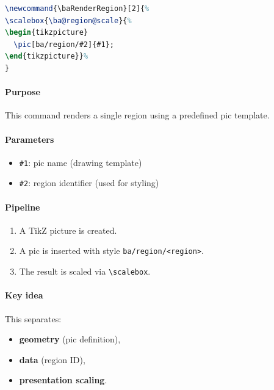 \begin{lstlisting}[language=LaTeX]
\newcommand{\baRenderRegion}[2]{%
\scalebox{\ba@region@scale}{%
\begin{tikzpicture}
  \pic[ba/region/#2]{#1};
\end{tikzpicture}}%
}
\end{lstlisting}

\paragraph{Purpose}

This command renders a single region using a predefined pic template.

\paragraph{Parameters}

\begin{itemize}
\item \texttt{\#1}: pic name (drawing template)
\item \texttt{\#2}: region identifier (used for styling)
\end{itemize}

\paragraph{Pipeline}

\begin{enumerate}
\item A TikZ picture is created.
\item A pic is inserted with style \texttt{ba/region/<region>}.
\item The result is scaled via \lstinline|\scalebox|.
\end{enumerate}

\paragraph{Key idea}

This separates:

\begin{itemize}
\item \textbf{geometry} (pic definition),
\item \textbf{data} (region ID),
\item \textbf{presentation scaling}.
\end{itemize}



